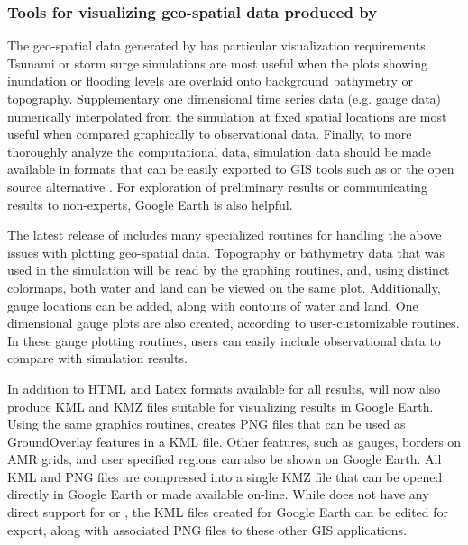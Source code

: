 \subsubsection{Tools for visualizing geo-spatial data produced by \geoclaw}
The geo-spatial data generated by \geoclaw has particular visualization
requirements.  Tsunami or storm surge simulations are most useful when
the plots showing inundation or flooding levels are overlaid onto
background bathymetry or topography.  Supplementary one dimensional
time series data (e.g. gauge data) numerically interpolated from
the simulation at fixed spatial locations are most useful when
compared graphically to observational data.  Finally, to more
thoroughly analyze the computational data, simulation data
should be made available in formats that can be easily exported to GIS tools
such as \agis or the open source alternative \qgis
\cite{arcgis,qgis}.  For exploration of preliminary results or
communicating results to non-experts, Google
Earth is also helpful.

The latest release of \clawpack includes many specialized \visclaw routines
for handling the above issues with plotting geo-spatial data.
Topography or bathymetry data that was
used in the simulation will be read by the graphing routines, and,
using distinct colormaps, both water and land can be viewed on the
same plot.   Additionally, gauge locations can be added, along with contours
of water and land.  One dimensional gauge plots are also created, according to
user-customizable routines. In these gauge plotting routines,
users can easily include  observational data to compare with \geoclaw
simulation results.

In addition to HTML and Latex formats available for all \clawpack results,
\visclaw will now also
produce KML and KMZ files suitable for visualizing results in Google Earth.
Using the same \mplotlib graphics routines, \visclaw creates PNG files
that can be used as GroundOverlay features in a KML file.  Other features, such
as gauges, borders on AMR grids, and user specified regions can also be
shown on Google Earth.  All KML and PNG files are compressed into a single
KMZ file  that can be opened directly in Google Earth or made available on-line.
While \visclaw does not have any direct support for \agis or \qgis,
the  KML files created for Google Earth can be edited for
export, along with associated PNG files to these other GIS applications.

